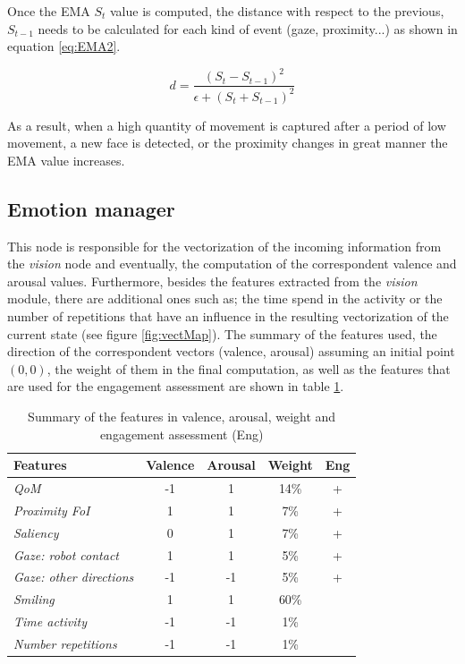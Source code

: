 \documentclass[a4paper, 10pt, conference]{ieeeconf}      %
\begin{document}
Once the EMA $S_t$ value is computed, the distance with respect to the previous, $S_{t-1}$ needs to be calculated for each kind of event (gaze, proximity...) as shown in equation \ref{eq:EMA2}.

\begin{equation} \label{eq:EMA2}
d = \frac{(S_t - S_{t-1})^2}{\epsilon + (S_t + S_{t-1})^2 }
\end{equation}

As a result, when a high quantity of movement is captured after a period of low movement, a new face is detected, or the proximity changes in great manner the EMA value increases.

\subsection{Emotion manager}
This node is responsible for the vectorization of the incoming information from the \textit{vision} node and eventually, the computation of the correspondent valence and arousal values. Furthermore, besides the features extracted from the \textit{vision} module, there are additional ones such as; the time spend in the activity or the number of repetitions that have an influence in the resulting vectorization of the current state (see figure \ref{fig:vectMap}). The summary of the features used, the direction of the correspondent vectors (valence, arousal) assuming an initial point $ (0,0) $, the weight of them in the final computation, as well as the features that are used for the engagement assessment are shown in table \ref{tab:cues}.

\begin{table}[h!]
\small
\centering
\begin{tabular}{l|c|c|c|c}
 \textbf{Features}   & \textbf{Valence}  & \textbf{Arousal}  & \textbf{Weight} & \textbf{Eng}\\ \hline	
 \textit{QoM}  	  		  	 &   -1 	&    1 	& 14\% &   +  \\ \hline
 \textit{Proximity FoI}    	  	 &   1  &    1	& 7\%  &   +  \\ \hline
 \textit{Saliency}	  	  	 &   0 	    &    1 	& 7\%  &   +  \\ \hline
 \textit{Gaze: robot contact} 	 &   1	&    1 	& 5\%  &   +  \\ \hline
 \textit{Gaze: other directions} & -1	&   -1  & 5\%  &   +  \\ \hline
 \textit{Smiling}	  	  	 &   1 	    &    1 	& 60\% &      \\ \hline
 \textit{Time activity}	  	 &   -1	    &   -1 	& 1\%  &      \\ \hline
 \textit{Number repetitions} &   -1 	&   -1	& 1\%  &       	

\end{tabular}
\caption{Summary of the features in valence, arousal, weight and engagement assessment (Eng)}
\label{tab:cues}
\end{table}
\end{document}
